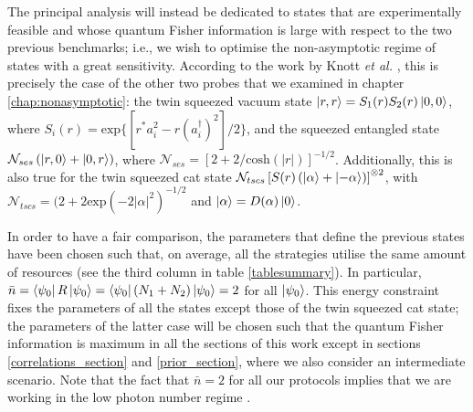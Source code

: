 The principal analysis will instead be dedicated to states that are experimentally feasible and whose quantum Fisher information is large with respect to the two previous benchmarks; i.e., we wish to optimise the non-asymptotic regime of states with a great sensitivity. According to the work by Knott \emph{et al.} \cite{PaulProctor2016}, this is precisely the case of the other two probes that we examined in chapter \ref{chap:nonasymptotic}: the twin squeezed vacuum state $\ket{r,r}=S_1(r)S_2(r)\ket{0,0}$, where $S_i(r) = \mathrm{exp}\lbrace[r^{*}a_i^2-r(a_i^{\dagger})^2]/2\rbrace$, and the squeezed entangled state $\mathcal{N}_{ses}\left(\ket{r,0}+\ket{0,r}\right)$, where $\mathcal{N}_{ses} = [2+2/\mathrm{cosh}(|r|)]^{-1/2}$. Additionally, this is also true for the twin squeezed cat state $\mathcal{N}_{tscs}\left[S(r)\left(\ket{\alpha}+\ket{-\alpha}\right)\right]^{\otimes 2}$, with $\mathcal{N}_{tscs}=(2+2\mathrm{exp}(-2|\alpha|^2)^{-1/2}$ and $\ket{\alpha} = D(\alpha)\ket{0}$. 

In order to have a fair comparison, the parameters that define the previous states have been chosen such that, on average, all the strategies utilise the same amount of resources (see the third column in table \ref{tablesummary}). In particular, $\bar{n} = \bra{\psi_0} R \ket{\psi_0} = \bra{\psi_0} (N_1 + N_2) \ket{\psi_0} = 2$ for all $\ket{\psi_0}$. This energy constraint fixes the parameters of all the states except those of the twin squeezed cat state; the parameters of the latter case will be chosen such that the quantum Fisher information is maximum in all the sections of this work except in sections \ref{correlations_section} and \ref{prior_section}, where we also consider an intermediate scenario. Note that the fact that $\bar{n} = 2$ for all our protocols implies that we are working in the low photon number regime \cite{PaulProctor2016}.

